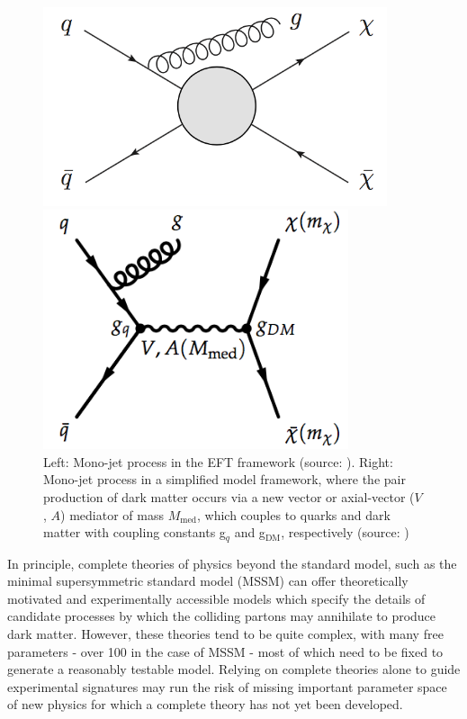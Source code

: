 \documentclass[12pt]{article}
\begin{document}
\begin{figure}[H]
	\centering
	\begin{minipage}[b]{0.45\textwidth}
	\includegraphics[width=0.9\textwidth]{figures/EFT_Signature.png}
	\end{minipage}
	\begin{minipage}[b]{0.45\textwidth}
	\includegraphics[width=0.8\textwidth]{figures/simplified_model.png}
	\end{minipage}
	\caption[]{Left: Mono-jet process in the EFT framework (source: \cite{beyond_eft}). Right: Mono-jet process in a simplified model framework, where the pair production of dark matter occurs via a new vector or axial-vector ($V$, $A$) mediator of mass $M_\text{med}$, which couples to quarks and dark matter with coupling constants g$_q$ and g$_\text{DM}$, respectively (source: \cite{dm_forum})}
	\label{fig:eft_simplified_model}
\end{figure}

In principle, complete theories of physics beyond the standard model, such as the minimal supersymmetric standard model (MSSM) \cite{mssm} can offer theoretically motivated and experimentally accessible models which specify the details of candidate processes by which the colliding partons may annihilate to produce dark matter. However, these theories tend to be quite complex, with many free parameters - over 100 in the case of MSSM \cite{DM_colliders} - most of which need to be fixed to generate a reasonably testable model. Relying on complete theories alone to guide experimental signatures may run the risk of missing important parameter space of new physics for which a complete theory has not yet been developed. 
\end{document}
